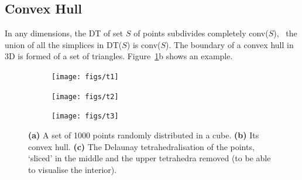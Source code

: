 \subsection{Convex Hull}
In any dimensions, the DT of set $S$ of points subdivides completely conv($S$), \ie\ the union of all the simplices in DT($S$) is conv($S$).
The boundary of a convex hull in 3D is formed of a set of triangles.
Figure~\ref{fig:dt2}b shows an example.
\begin{figure}
  \centering
  \begin{subfigure}[b]{0.29\linewidth}
    \texttt{[image: figs/t1]}
    \caption{}
  \end{subfigure}%
  \qquad
  \begin{subfigure}[b]{0.29\linewidth}
    \texttt{[image: figs/t2]}
    \caption{}
  \end{subfigure}%
  \qquad
  \begin{subfigure}[b]{0.29\linewidth}
    \texttt{[image: figs/t3]}
    \caption{}
  \end{subfigure}%
  \caption[A set of points, its convex hull and its Delaunay tetrahedralisation]{\textbf{(a)} A set of 1000 points randomly distributed in a cube. \textbf{(b)} Its convex hull. \textbf{(c)} The Delaunay tetrahedralisation of the points, `sliced' in the middle and the upper tetrahedra removed (to be able to visualise the interior).}%
\label{fig:dt2}
\end{figure}



